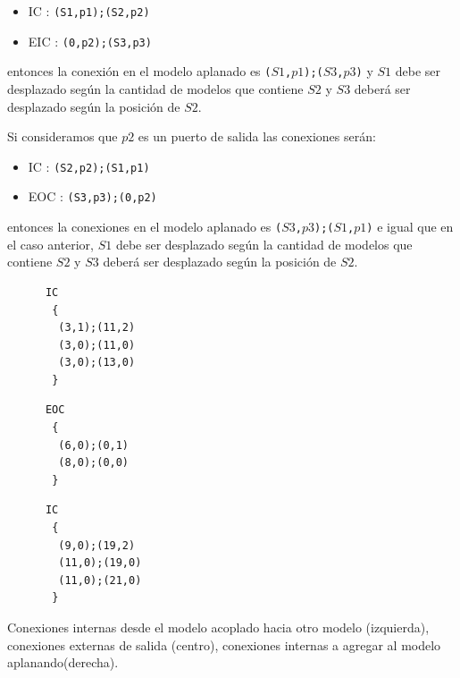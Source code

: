 \begin{itemize}
	\begin{itemize}
	\item IC : \texttt{(S1,p1);(S2,p2)}
	\item EIC : \texttt{(0,p2);(S3,p3)}
	\end{itemize}

	entonces la conexión en el modelo aplanado es \texttt{($S1$,$p1$);($S3$,$p3$)} y $S1$ debe ser desplazado según la cantidad de modelos que contiene $S2$ y 
	$S3$ deberá ser desplazado según la posición de $S2$.

	Si consideramos que $p2$ es un puerto de salida las conexiones serán:

	\begin{itemize}
	\item IC : \texttt{(S2,p2);(S1,p1)}
	\item EOC : \texttt{(S3,p3);(0,p2)}
	\end{itemize}

	entonces la conexiones en el modelo aplanado es \texttt{($S3$,$p3$);($S1$,$p1$)} e igual que en el caso anterior, $S1$ debe ser desplazado según la 
	cantidad de modelos que contiene $S2$ y $S3$ deberá ser desplazado según la posición de $S2$.


\begin{listing}
\begin{minipage}[t]{0.3\linewidth}
\begin{verbatim}
      IC
       {
        (3,1);(11,2)
        (3,0);(11,0)
        (3,0);(13,0)
       }
\end{verbatim}
\end{minipage}
\begin{minipage}[t]{0.3\linewidth}
\begin{verbatim}
      EOC
       {
        (6,0);(0,1)
        (8,0);(0,0)
       }
\end{verbatim}
\end{minipage}
\begin{minipage}[t]{0.3\linewidth}
\begin{verbatim}
      IC
       {
        (9,0);(19,2)
        (11,0);(19,0)
        (11,0);(21,0)
       }
\end{verbatim}
\end{minipage}
\caption{Conexiones internas desde el modelo acoplado hacia otro modelo (izquierda), conexiones externas de salida (centro), conexiones internas a agregar al modelo aplanando(derecha).}\label{lst:conecOut}
\end{listing}


\end{itemize}
